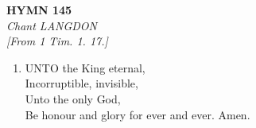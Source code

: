 \newpage
\begin{center}
    {\Large \textbf{HYMN 145}}
    \\
    \textit{Chant LANGDON}
    \\
    \textit{\small [From 1 Tim. 1. 17.]}
\end{center}
\vspace{1em}

\begin{enumerate}
    \item UNTO the King eternal, \\
        Incorruptible, invisible, \\
        Unto the only God, \\
        Be honour and glory for ever and ever. Amen.

\end{enumerate}
